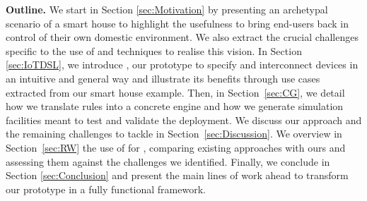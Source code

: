 
\noindent
\textbf{Outline.} We start in Section \ref{sec:Motivation} by presenting an archetypal scenario of a smart house to highlight the usefulness to bring end-users back in control of their own domestic \IOT environment. We also extract the crucial \IOT challenges specific to the use of \DSLS and \MDE techniques to realise this vision. In Section \ref{sec:IoTDSL}, we introduce \IOTDSL, our prototype \DSL to specify and interconnect devices in an intuitive and general way and illustrate its benefits through use cases extracted from our smart house example. Then, in Section~\ref{sec:CG}, we detail how we translate \IOTDSL rules into a concrete \CEP engine and how we generate simulation facilities meant to test and validate the \IOT deployment. We discuss our approach and the remaining challenges to tackle in Section~\ref{sec:Discussion}. We overview in Section~\ref{sec:RW} the use of \DSLS for \IOT, comparing existing approaches with ours and assessing them against the challenges we identified. Finally, we conclude in Section \ref{sec:Conclusion} and present the main lines of work ahead to transform our prototype in a fully functional \DSL framework.
